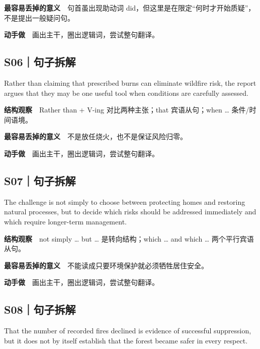 \documentclass[a4paper,11pt,openany]{report}
\renewenvironment{quote}{%
 \par\begin{list}{}{\setlength{\leftmargin}{1.25em}\setlength{\rightmargin}{0em}}\item[]\color{bodygrey}\ignorespaces
}{\end{list}}
\begin{document}
\textbf{最容易丢掉的意义}　句首虽出现助动词 did，但这里是在限定``何时才开始质疑''，不是提出一般疑问句。

\textbf{动手做}　画出主干，圈出逻辑词，尝试整句翻译。

\subsection{S06｜句子拆解}\label{s06ux53e5ux5b50ux62c6ux89e3}

\begin{quote}
Rather than claiming that prescribed burns can eliminate wildfire risk, the report argues that they may be one useful tool when conditions are carefully assessed.
\end{quote}

\textbf{结构观察}　Rather than + V-ing 对比两种主张；that 宾语从句；when \ldots{} 条件/时间语境。

\textbf{最容易丢掉的意义}　不是放任烧火，也不是保证风险归零。

\textbf{动手做}　画出主干，圈出逻辑词，尝试整句翻译。

\subsection{S07｜句子拆解}\label{s07ux53e5ux5b50ux62c6ux89e3}

\begin{quote}
The challenge is not simply to choose between protecting homes and restoring natural processes, but to decide which risks should be addressed immediately and which require longer-term management.
\end{quote}

\textbf{结构观察}　not simply \ldots{} but \ldots{} 是转向结构；which \ldots{} and which \ldots{} 两个平行宾语从句。

\textbf{最容易丢掉的意义}　不能读成只要环境保护就必须牺牲居住安全。

\textbf{动手做}　画出主干，圈出逻辑词，尝试整句翻译。

\subsection{S08｜句子拆解}\label{s08ux53e5ux5b50ux62c6ux89e3}

\begin{quote}
That the number of recorded fires declined is evidence of successful suppression, but it does not by itself establish that the forest became safer in every respect.
\end{quote}
\end{document}
